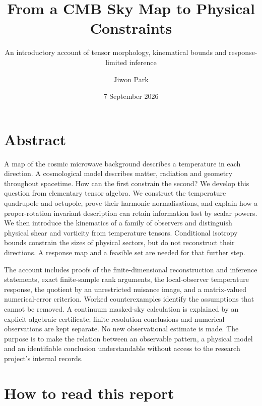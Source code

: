 \documentclass[
  11pt,
  a4paper]{article}
\title{From a CMB Sky Map to Physical Constraints}
\subtitle{An introductory account of tensor morphology, kinematical bounds and response-limited inference}
\author{Jiwon Park}
\date{7 September 2026}
\begin{document}
\maketitle

{
\hypersetup{linkcolor=}
\setcounter{tocdepth}{2}
\tableofcontents
}
\clearpage
{}

\hypertarget{abstract}{%
\section*{Abstract}\label{abstract}}

A map of the cosmic microwave background describes a temperature in each direction. A cosmological model describes matter, radiation and geometry throughout spacetime. How can the first constrain the second? We develop this question from elementary tensor algebra. We construct the temperature quadrupole and octupole, prove their harmonic normalisations, and explain how a proper-rotation invariant description can retain information lost by scalar powers. We then introduce the kinematics of a family of observers and distinguish physical shear and vorticity from temperature tensors. Conditional isotropy bounds constrain the sizes of physical sectors, but do not reconstruct their directions. A response map and a feasible set are needed for that further step.

The account includes proofs of the finite-dimensional reconstruction and inference statements, exact finite-sample rank arguments, the local-observer temperature response, the quotient by an unrestricted nuisance image, and a matrix-valued numerical-error criterion. Worked counterexamples identify the assumptions that cannot be removed. A continuum masked-sky calculation is explained by an explicit algebraic certificate; finite-resolution conclusions and numerical observations are kept separate. No new observational estimate is made. The purpose is to make the relation between an observable pattern, a physical model and an identifiable conclusion understandable without access to the research project's internal records.

\clearpage
{}

\hypertarget{how-to-read-this-report}{%
\section*{How to read this report}\label{how-to-read-this-report}}
\end{document}
